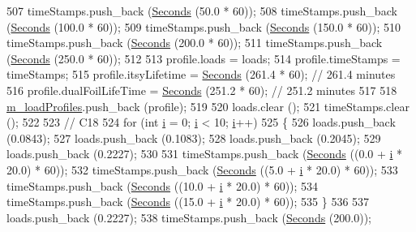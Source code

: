 \begin{DoxyCode}
507   timeStamps.push\_back (\hyperlink{group__timecivil_ga33c34b816f8ff6628e33d5c8e9713b9e}{Seconds} (50.0 * 60));
508   timeStamps.push\_back (\hyperlink{group__timecivil_ga33c34b816f8ff6628e33d5c8e9713b9e}{Seconds} (100.0 * 60));
509   timeStamps.push\_back (\hyperlink{group__timecivil_ga33c34b816f8ff6628e33d5c8e9713b9e}{Seconds} (150.0 * 60));
510   timeStamps.push\_back (\hyperlink{group__timecivil_ga33c34b816f8ff6628e33d5c8e9713b9e}{Seconds} (200.0 * 60));
511   timeStamps.push\_back (\hyperlink{group__timecivil_ga33c34b816f8ff6628e33d5c8e9713b9e}{Seconds} (250.0 * 60));
512 
513   profile.loads = loads;
514   profile.timeStamps = timeStamps;
515   profile.itsyLifetime = \hyperlink{group__timecivil_ga33c34b816f8ff6628e33d5c8e9713b9e}{Seconds} (261.4 * 60);      \textcolor{comment}{// 261.4 minutes}
516   profile.dualFoilLifeTime = \hyperlink{group__timecivil_ga33c34b816f8ff6628e33d5c8e9713b9e}{Seconds} (251.2 * 60);  \textcolor{comment}{// 251.2 minutes}
517 
518   \hyperlink{classBatteryLifetimeTest_aee9ad324da18f58ee75689778580c3fb}{m\_loadProfiles}.push\_back (profile);
519 
520   loads.clear ();
521   timeStamps.clear ();
522 
523   \textcolor{comment}{// C18}
524   \textcolor{keywordflow}{for} (\textcolor{keywordtype}{int} \hyperlink{bernuolliDistribution_8m_a6f6ccfcf58b31cb6412107d9d5281426}{i} = 0; \hyperlink{bernuolliDistribution_8m_a6f6ccfcf58b31cb6412107d9d5281426}{i} < 10; \hyperlink{bernuolliDistribution_8m_a6f6ccfcf58b31cb6412107d9d5281426}{i}++)
525     \{
526       loads.push\_back (0.0843);
527       loads.push\_back (0.1083);
528       loads.push\_back (0.2045);
529       loads.push\_back (0.2227);
530 
531       timeStamps.push\_back (\hyperlink{group__timecivil_ga33c34b816f8ff6628e33d5c8e9713b9e}{Seconds} ((0.0 + \hyperlink{bernuolliDistribution_8m_a6f6ccfcf58b31cb6412107d9d5281426}{i} * 20.0) * 60));
532       timeStamps.push\_back (\hyperlink{group__timecivil_ga33c34b816f8ff6628e33d5c8e9713b9e}{Seconds} ((5.0 + \hyperlink{bernuolliDistribution_8m_a6f6ccfcf58b31cb6412107d9d5281426}{i} * 20.0) * 60));
533       timeStamps.push\_back (\hyperlink{group__timecivil_ga33c34b816f8ff6628e33d5c8e9713b9e}{Seconds} ((10.0 + \hyperlink{bernuolliDistribution_8m_a6f6ccfcf58b31cb6412107d9d5281426}{i} * 20.0) * 60));
534       timeStamps.push\_back (\hyperlink{group__timecivil_ga33c34b816f8ff6628e33d5c8e9713b9e}{Seconds} ((15.0 + \hyperlink{bernuolliDistribution_8m_a6f6ccfcf58b31cb6412107d9d5281426}{i} * 20.0) * 60));
535     \}
536 
537   loads.push\_back (0.2227);
538   timeStamps.push\_back (\hyperlink{group__timecivil_ga33c34b816f8ff6628e33d5c8e9713b9e}{Seconds} (200.0));

\end{DoxyCode}
